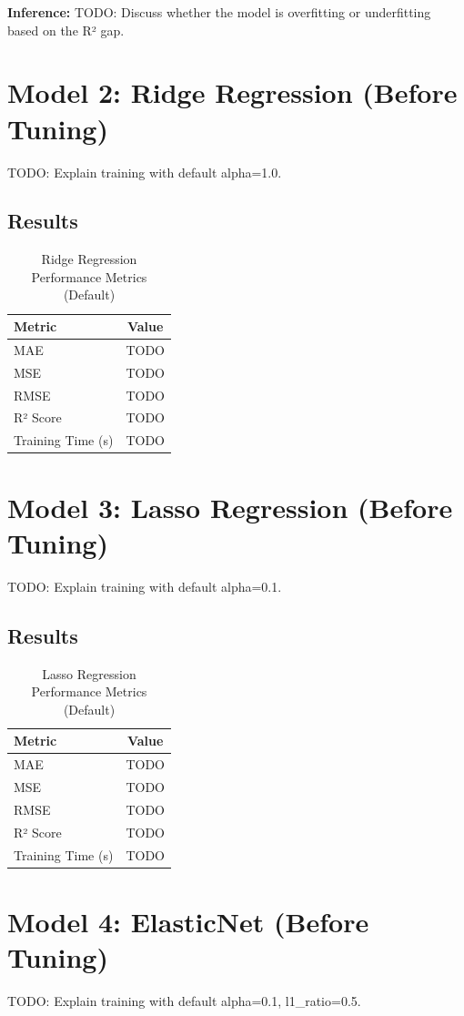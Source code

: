 \documentclass[12pt,a4paper]{article}
\begin{document}
\textbf{Inference:}
TODO: Discuss whether the model is overfitting or underfitting based on the R² gap.

\section{Model 2: Ridge Regression (Before Tuning)}
TODO: Explain training with default alpha=1.0.

\subsection{Results}
\begin{table}[H]
\centering
\begin{tabular}{lc}
\toprule
\textbf{Metric} & \textbf{Value} \\ \midrule
MAE & TODO \\
MSE & TODO \\
RMSE & TODO \\
R² Score & TODO \\
Training Time (s) & TODO \\
\bottomrule
\end{tabular}
\caption{Ridge Regression Performance Metrics (Default)}
\end{table}

\section{Model 3: Lasso Regression (Before Tuning)}
TODO: Explain training with default alpha=0.1.

\subsection{Results}
\begin{table}[H]
\centering
\begin{tabular}{lc}
\toprule
\textbf{Metric} & \textbf{Value} \\ \midrule
MAE & TODO \\
MSE & TODO \\
RMSE & TODO \\
R² Score & TODO \\
Training Time (s) & TODO \\
\bottomrule
\end{tabular}
\caption{Lasso Regression Performance Metrics (Default)}
\end{table}

\section{Model 4: ElasticNet (Before Tuning)}
TODO: Explain training with default alpha=0.1, l1\_ratio=0.5.
\end{document}
